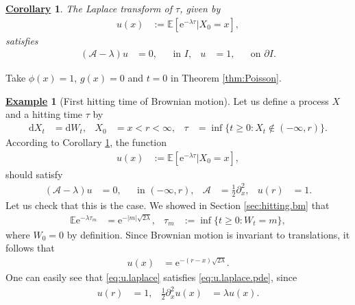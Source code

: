 \documentclass[12pt]{book}
\let\varphi\phi
\numberwithin{equation}{chapter}
\theoremstyle{plain}
\numberwithin{theorem}{section}
\newtheorem{corollary}[theorem]{\underline{Corollary}}
\theoremstyle{definition}
\newtheorem{example}[theorem]{\underline{Example}}
\numberwithin{exercise}{chapter}
\let\oldendproof\endproof
\renewenvironment{proof}[1][\proofname]{%
  \oldproof[\scshape\underline{#1}]%
}{\oldendproof}
\newcommand{\<}{\langle}
\renewcommand{\>}{\rangle}
\renewcommand{\(}{\left(}
\renewcommand{\)}{\right)}
\renewcommand{\[}{\left[}
\renewcommand{\]}{\right]}
\newcommand\Eb{\mathds{E}}
\newcommand\Ac{\mathscr{A}}
\newcommand\lam{\lambda}
\renewcommand\d{\partial}
\newcommand\dd{\mathrm{d}}
\newcommand\ee{\mathrm{e}}
\begin{document}
\begin{corollary}
\label{cor:laplace}
The Laplace transform of $\tau$, given by
\begin{align}
u(x)
	&:=	\Eb[ \ee^{- \lam \tau } | X_0 = x] , 
\end{align}
satisfies
\begin{align}
(\Ac - \lam) u
	&=	0 , &
	&\text{in $I$} , &
u
	&=	1 , &
	&\text{on $\d I$}.
\end{align}
\end{corollary}

\begin{proof}
Take $\varphi(x) = 1$, $g(x) = 0$ and $t=0$ in Theorem \ref{thm:Poisson}.
\end{proof}

\begin{example}[First hitting time of Brownian motion]
Let us define a process $X$ and a hitting time $\tau$ by
\begin{align}
\dd X_t
	&=	\dd W_t , &
X_0
	&=	x < r < \infty , &
\tau
	&=	\inf\{ t \geq 0 : X_t \notin (-\infty,r) \} .
\end{align}
According to Corollary \ref{cor:laplace}, the function
\begin{align}
u(x)
	&:= \Eb[ \ee^{- \lam \tau} | X_0 = x ] ,
\end{align}
should satisfy
\begin{align}
(\Ac - \lam) u
	&=	0 , &
	&\text{in $(-\infty,r)$} , &
\Ac
	&=	\tfrac{1}{2} \d_x^2 , &
u(r)
	&=	1 . \label{eq:u.laplace.pde}
\end{align}
Let us check that this is the case.  We showed in Section \ref{sec:hitting.bm} that
\begin{align}
\Eb \ee^{- \lam \tau_m}
	&=	\ee^{- |m| \sqrt{2 \lam}} , &
\tau_m
	&:=	\inf\{ t \geq 0 : W_t = m \} ,
\end{align}
where $W_0 = 0$ by definition.  Since Brownian motion is invariant to translations, it follows that
\begin{align}
u(x)
	&=	\ee^{-(r - x)\sqrt{2 \lam}} . \label{eq:u.laplace}
\end{align}
One can easily see that \eqref{eq:u.laplace} satisfies \eqref{eq:u.laplace.pde}, since
\begin{align}
u(r)
	&=	1 , &
\tfrac{1}{2} \d_x^2 u(x) 
	&= \lam u(x) .
\end{align}
\end{example}

\end{document}
